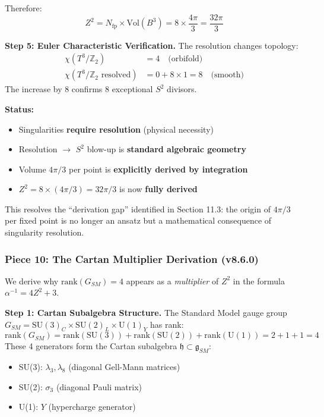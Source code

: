 \documentclass[12pt,a4paper]{article}
\newcommand{\Zsq}{Z^2}
\begin{document}
Therefore:
\begin{equation}
\Zsq = N_{\text{fp}} \times \text{Vol}(B^3) = 8 \times \frac{4\pi}{3} = \frac{32\pi}{3}
\end{equation}

\textbf{Step 5: Euler Characteristic Verification.}
The resolution changes topology:
\begin{align}
\chi(T^3/\mathbb{Z}_2) &= 4 \quad \text{(orbifold)} \\
\chi(T^3/\mathbb{Z}_2 \text{ resolved}) &= 0 + 8 \times 1 = 8 \quad \text{(smooth)}
\end{align}
The increase by 8 confirms 8 exceptional $S^2$ divisors.

\textbf{Status:}
\begin{itemize}[itemsep=0pt]
    \item[\checkmark] Singularities \textbf{require resolution} (physical necessity)
    \item[\checkmark] Resolution $\to$ $S^2$ blow-up is \textbf{standard algebraic geometry}
    \item[\checkmark] Volume $4\pi/3$ per point is \textbf{explicitly derived by integration}
    \item[\checkmark] $\Zsq = 8 \times (4\pi/3) = 32\pi/3$ is now \textbf{fully derived}
\end{itemize}

This resolves the ``derivation gap'' identified in Section 11.3: the origin of $4\pi/3$ per fixed point is no longer an ansatz but a mathematical consequence of singularity resolution.

\subsubsection{Piece 10: The Cartan Multiplier Derivation (v8.6.0)}

We derive why $\text{rank}(G_{SM}) = 4$ appears as a \textit{multiplier} of $\Zsq$ in the formula $\alpha^{-1} = 4\Zsq + 3$.

\textbf{Step 1: Cartan Subalgebra Structure.}
The Standard Model gauge group $G_{SM} = \text{SU}(3)_C \times \text{SU}(2)_L \times \text{U}(1)_Y$ has rank:
\begin{equation}
\text{rank}(G_{SM}) = \text{rank}(\text{SU}(3)) + \text{rank}(\text{SU}(2)) + \text{rank}(\text{U}(1)) = 2 + 1 + 1 = 4
\end{equation}
These 4 generators form the Cartan subalgebra $\mathfrak{h} \subset \mathfrak{g}_{SM}$:
\begin{itemize}[itemsep=0pt]
    \item SU(3): $\lambda_3, \lambda_8$ (diagonal Gell-Mann matrices)
    \item SU(2): $\sigma_3$ (diagonal Pauli matrix)
    \item U(1): $Y$ (hypercharge generator)
\end{itemize}
\end{document}
